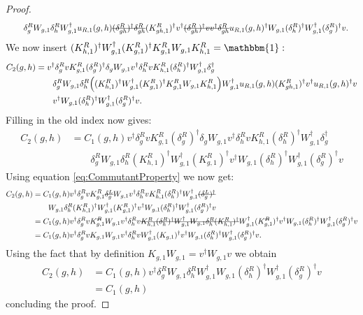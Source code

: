 \documentclass[12pt,a4paper,twoside]{article}
\newcommand{\stkout}[1]{\ifmmode\text{\sout{\ensuremath{#1}}}\else\sout{#1}\fi}
\let\originalleft\left
\let\originalright\right
\renewcommand{\left}{\mathopen{}\mathclose\bgroup\originalleft}
\renewcommand{\right}{\aftergroup\egroup\originalright}
\newcommand{\id}{\mathbbm{1}}
\theoremstyle{definition}
\numberwithin{equation}{section}
\begin{document}
\begin{proof}
\begin{align}
		\nonumber
		&\qquad \delta_g^R W_{g,1}\delta_h^R W_{g,1}^\dagger u_{R,1}(g,h)\stkout{(\delta_{gh}^R)^\dagger \delta_{gh}^R} (K_{gh,1}^R)^\dagger v^\dagger \stkout{(\delta_{gh}^R)^\dagger v  v^\dagger \delta^R_{gh}} u_{R,1}(g,h)^\dagger W_{g,1}(\delta^R_h)^\dagger W_{g,1}^\dagger(\delta_g^R)^\dagger v.
	\end{align}
	We now insert $(K_{h,1}^R)^\dagger W_{g,1}^\dagger (K_{g,1}^R)^\dagger K_{g,1}^R W_{g,1}K_{h,1}^R=\id:$
	\begin{align}	
		C_2(g,h)&=v^\dagger \delta_g^R v K_{g,1}^R (\delta_g^R)^\dagger \delta_g W_{g,1}v^\dagger \delta_h^R v K_{h,1}^R (\delta_h^R)^\dagger W_{g,1}^\dagger \delta_g^\dagger\\
		\nonumber
		&\qquad \delta_g^R W_{g,1}\delta_h^R \left((K_{h,1}^R)^\dagger W_{g,1}^\dagger (K_{g,1}^R)^\dagger K_{g,1}^R W_{g,1}K_{h,1}^R\right) W_{g,1}^\dagger u_{R,1}(g,h) (K_{gh,1}^R)^\dagger v^\dagger u_{R,1}(g,h)^\dagger v\\
		\nonumber
		&\qquad v^\dagger W_{g,1}(\delta^R_h)^\dagger W_{g,1}^\dagger(\delta_g^R)^\dagger v.
	\end{align}
	Filling in the old index now gives:
	\begin{align}
		C_2(g,h)&=C_1(g,h)v^\dagger \delta_g^R v K_{g,1}^R (\delta_g^R)^\dagger \delta_g W_{g,1}v^\dagger \delta_h^R v K_{h,1}^R (\delta_h^R)^\dagger W_{g,1}^\dagger \delta_g^\dagger\\
		\nonumber
		&\qquad \delta_g^R W_{g,1}\delta_h^R (K_{h,1}^R)^\dagger W_{g,1}^\dagger (K_{g,1}^R)^\dagger v^\dagger W_{g,1}(\delta^R_h)^\dagger W_{g,1}^\dagger(\delta_g^R)^\dagger v
	\end{align}
	Using equation \eqref{eq:CommutantProperty} we now get:
	\begin{align}
		C_2(g,h)&=C_1(g,h)v^\dagger \delta_g^R v K_{g,1}^R \stkout{\delta_g^L} W_{g,1}v^\dagger \delta_h^R v K_{h,1}^R (\delta_h^R)^\dagger W_{g,1}^\dagger \stkout{(\delta_g^L)^\dagger}\\
		\nonumber
		&\qquad  W_{g,1}\delta_h^R (K_{h,1}^R)^\dagger W_{g,1}^\dagger (K_{g,1}^R)^\dagger v^\dagger W_{g,1}(\delta^R_h)^\dagger W_{g,1}^\dagger(\delta_g^R)^\dagger v\\
		&=C_1(g,h)v^\dagger \delta_g^R v K_{g,1}^\stkout{R} W_{g,1}v^\dagger \delta_h^R v \stkout{K_{h,1}^R (\delta_h^R)^\dagger W_{g,1}^\dagger W_{g,1}\delta_h^R (K_{h,1}^R)^\dagger} W_{g,1}^\dagger (K_{g,1}^\stkout{R})^\dagger v^\dagger W_{g,1}(\delta^R_h)^\dagger W_{g,1}^\dagger(\delta_g^R)^\dagger v\\
		&=C_1(g,h)v^\dagger \delta_g^R v K_{g,1} W_{g,1}v^\dagger \delta_h^R v W_{g,1}^\dagger (K_{g,1})^\dagger v^\dagger W_{g,1}(\delta^R_h)^\dagger W_{g,1}^\dagger(\delta_g^R)^\dagger v.
	\end{align}
	Using the fact that by definition $K_{g,1}W_{g,1}=v^\dagger W_{g,1}v$ we obtain
	\begin{align}
		C_2(g,h)&=C_1(g,h)v^\dagger \delta_g^R W_{g,1} \delta_h^R W_{g,1}^\dagger  W_{g,1}(\delta^R_h)^\dagger W_{g,1}^\dagger(\delta_g^R)^\dagger v\\
		&=C_1(g,h)
	\end{align}
	concluding the proof.
\end{proof}
\end{document}
